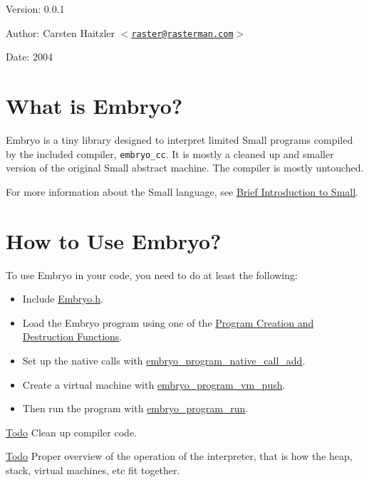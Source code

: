  \begin{Desc}
\item[Version:]0.0.1 \end{Desc}
\begin{Desc}
\item[Author:]Carsten Haitzler $<$\href{mailto:raster@rasterman.com}{\tt raster@rasterman.com}$>$ \end{Desc}
\begin{Desc}
\item[Date:]2004\end{Desc}
\hypertarget{index_intro}{}\section{What is Embryo?}\label{index_intro}
Embryo is a tiny library designed to interpret limited Small programs compiled by the included compiler, {\tt embryo\_\-cc}. It is mostly a cleaned up and smaller version of the original Small abstract machine. The compiler is mostly untouched.

For more information about the Small language, see \hyperlink{Small_Page}{Brief Introduction to Small}.\hypertarget{index_How_to_Use}{}\section{How to Use Embryo?}\label{index_How_to_Use}
To use Embryo in your code, you need to do at least the following:

\begin{itemize}
\item Include \hyperlink{Embryo_8h}{Embryo.h}. \item Load the Embryo program using one of the \hyperlink{group__Embryo__Program__Creation__Group}{Program Creation and Destruction Functions}. \item Set up the native calls with \hyperlink{group__Embryo__Func__Group_g1164bbcc4dc623c54a1916f05499c9cb}{embryo\_\-program\_\-native\_\-call\_\-add}. \item Create a virtual machine with \hyperlink{group__Embryo__Program__VM__Group_g4c0362643f9ae872754caabe32ad9764}{embryo\_\-program\_\-vm\_\-push}. \item Then run the program with \hyperlink{group__Embryo__Run__Group_ga061469476a430fd33e89951300fd62a}{embryo\_\-program\_\-run}.\end{itemize}
\begin{Desc}
\item[\hyperlink{todo__todo000001}{Todo}]Clean up compiler code. \end{Desc}
\begin{Desc}
\item[\hyperlink{todo__todo000001}{Todo}]Proper overview of the operation of the interpreter, that is how the heap, stack, virtual machines, etc fit together. \end{Desc}
